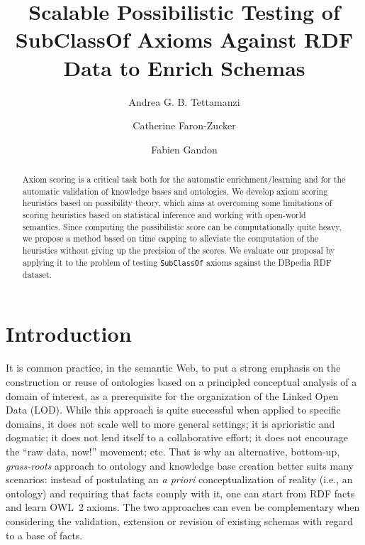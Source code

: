 \documentclass{llncs}
\begin{document}
\title{Scalable Possibilistic Testing of SubClassOf Axioms Against RDF Data to Enrich Schemas}


\author{Andrea G. B. Tettamanzi \and Catherine Faron-Zucker \and Fabien Gandon}
%
%
%

\maketitle

\begin{abstract}
Axiom scoring is a critical task both for the automatic enrichment/learning
and for the automatic validation of knowledge bases and ontologies.
We develop axiom scoring heuristics based on possibility theory,
which aims at overcoming some limitations of scoring heuristics based on statistical inference
and working with open-world semantics.
Since computing the possibilistic score can be computationally quite heavy, we propose a method based on time capping
to alleviate the computation of the heuristics without giving up the precision of the scores.
We evaluate our proposal by applying it to the problem of testing \texttt{SubClassOf}
axioms against the DBpedia RDF dataset.
\end{abstract}


\section{Introduction}

It is common practice, in the semantic Web, to put a strong emphasis
on the construction or reuse of ontologies based on a principled conceptual analysis
of a domain of interest, as a prerequisite for the organization of the Linked Open Data (LOD).
While this approach is quite successful when applied to specific domains,
it does not scale well to more general settings;
it is aprioristic and dogmatic;
it does not lend itself to a collaborative effort; 
it does not encourage the ``raw data, now!'' movement; etc.
That is why an alternative, bottom-up, \emph{grass-roots} approach to ontology and
knowledge base creation better suits many scenarios: instead of postulating an \emph{a priori}
conceptualization of reality (i.e., an ontology) and requiring that facts comply with it, one can start from RDF facts and learn OWL~2 axioms. The two approaches can even be complementary when considering the validation, extension or revision of  existing schemas with regard to a base of facts.
\end{document}
